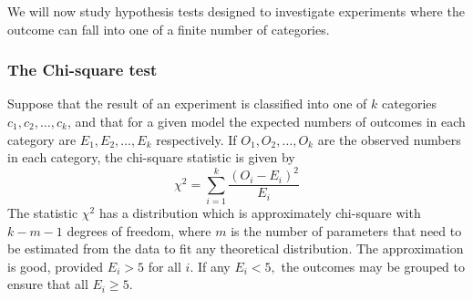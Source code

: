 \documentclass[12pt]{article}
\theoremstyle{break}
\begin{document}
We will now study hypothesis tests designed to investigate experiments where the outcome can fall into one of a finite number of categories.

\subsubsection{The Chi-square test}
Suppose that the result of an experiment is classified into one of $k$ categories $c_{1},c_{2},\ldots,c_{k}$, and that for a given model the expected numbers of outcomes in each category are $E_{1},E_{2},\ldots,E_{k}$ respectively. If $O_{1},O_{2},\ldots,O_{k}$ are the observed numbers in each category, the chi-square statistic is given by
$$
\chi^{2}=\sum_{i=1}^{k}\frac{(O_{i}-E_{i})^2}{E_{i}}
$$
The statistic $\chi^2$ has a distribution which is approximately chi-square with $k-m-1$ degrees of freedom, where $m$ is the number of parameters that need to be estimated from the data to fit any theoretical distribution. The approximation is good, provided $E_{i}>5$ for all $i$. If any $E_{i}<5,$ the outcomes may be grouped to ensure that all $E_{i}\geq 5.$
\end{document}
